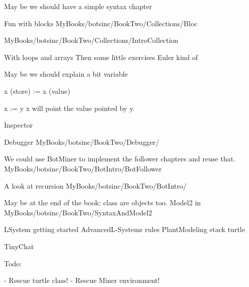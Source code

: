 


May be we should have a simple syntax chapter

Fun with blocks
	MyBooks/botsinc/BookTwo/Collections/Bloc
	
MyBooks/botsinc/BookTwo/Collections/IntroCollection	
	
	
With loops and arrays
Then some little exercises 
	Euler kind of 


May be we should explain a bit variable

	x (store) := x (value)
	
	x := y 
	x will point the value pointed by y. 
	

Inspector

Debugger
	MyBooks/botsinc/BookTwo/Debugger/

We could use BotMiner to implement the follower chapters and reuse that. 
	MyBooks/botsinc/BookTwo/BotIntro/BotFollower

A look at recursion
	MyBooks/botsinc/BookTwo/BotIntro/

May be at the end of the book: class are objects too. 
	Model2 in MyBooks/botsinc/BookTwo/SyntaxAndModel2
	
	LSystem
		getting started
	AdvancedL-Systems	
		rules
	PlantModeling
		stack turtle

TinyChat

Todo: 

- Rescue turtle class!
- Rescue Miner environment!

